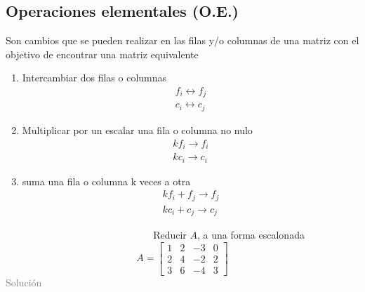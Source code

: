 \subsection{Operaciones elementales (O.E.)}
Son cambios que se pueden realizar en las filas y/o columnas de una matriz con el objetivo de encontrar una matriz equivalente
\begin{enumerate}
	\item Intercambiar dos filas o columnas
	\begin{gather*}
		f_i\leftrightarrow f_j \\
		c_i\leftrightarrow c_j
	\end{gather*}
	\item Multiplicar por un escalar una fila o columna no nulo
	\begin{gather*}
		kf_i\rightarrow f_i \\
		kc_i\rightarrow c_i
	\end{gather*}
	\item suma una fila o columna k veces a otra
	\begin{gather*}
		kf_i+f_j\rightarrow f_j \\
		kc_i+c_j\rightarrow c_j
	\end{gather*} 
\end{enumerate}
\addtocounter{exr}{1} 
\colorbox{gray!55}{\textcolor{white}{Ej.) O.E. reduc
		ción a escalonada}}
	Reducir $A$, a una forma escalonada
	$$ A=\begin{bmatrix}
		1 & 2 & -3 & 0 \\
		2 & 4 & -2 & 2 \\
		3 & 6 & -4 & 3
	\end{bmatrix} $$
\textcolor{gray}{Solución }
